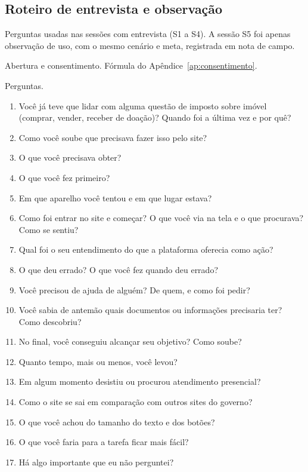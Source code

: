 \documentclass[
  12pt,
  oneside,
  a4paper,
  chapter=TITLE,
  section=TITLE,
  english,
  brazilian
]{abntex2}
\begin{document}
\postextual



\begin{apendicesenv}
\partapendices

\chapter{Roteiro de entrevista e observação}\label{ap:roteiro}

Perguntas usadas nas sessões com entrevista (S1 a S4). A sessão S5 foi apenas observação de uso, com o mesmo cenário e meta, registrada em nota de campo.

Abertura e consentimento. Fórmula do Apêndice~\ref{ap:consentimento}.

Perguntas.
\begin{enumerate}
  \item Você já teve que lidar com alguma questão de imposto sobre imóvel
    (comprar, vender, receber de doação)? Quando foi a última vez e por quê?
  \item Como você soube que precisava fazer isso pelo site?
  \item O que você precisava obter?
  \item O que você fez primeiro?
  \item Em que aparelho você tentou e em que lugar estava?
  \item Como foi entrar no site e começar? O que você via na tela e o que
    procurava? Como se sentiu?
  \item Qual foi o seu entendimento do que a plataforma oferecia como ação?
  \item O que deu errado? O que você fez quando deu errado?
  \item Você precisou de ajuda de alguém? De quem, e como foi pedir?
  \item Você sabia de antemão quais documentos ou informações precisaria ter?
    Como descobriu?
  \item No final, você conseguiu alcançar seu objetivo? Como soube?
  \item Quanto tempo, mais ou menos, você levou?
  \item Em algum momento desistiu ou procurou atendimento presencial?
  \item Como o site se sai em comparação com outros sites do governo?
  \item O que você achou do tamanho do texto e dos botões?
  \item O que você faria para a tarefa ficar mais fácil?
  \item Há algo importante que eu não perguntei?
\end{enumerate}


\end{apendicesenv}
\end{document}
